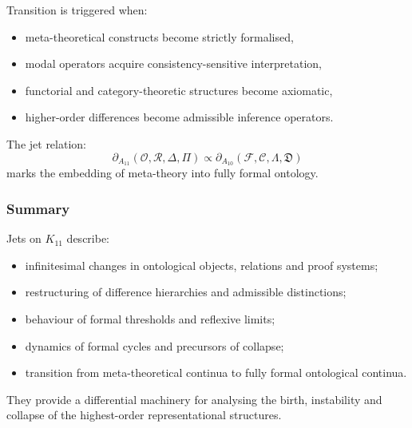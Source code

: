 Transition is triggered when:
\begin{itemize}
    \item meta-theoretical constructs become strictly formalised,
    \item modal operators acquire consistency-sensitive interpretation,
    \item functorial and category-theoretic structures become axiomatic,
    \item higher-order differences become admissible inference operators.
\end{itemize}

The jet relation:
\[
\partial_{A_{11}}(\mathcal{O},\mathcal{R},\Delta,\Pi)
\propto
\partial_{A_{10}}(\mathcal{F},\mathcal{C},\Lambda,\mathfrak{D})
\]
marks the embedding of meta-theory into fully formal ontology.


\subsubsection{Summary}

Jets on $K_{11}$ describe:
\begin{itemize}
    \item infinitesimal changes in ontological objects, relations and
          proof systems;
    \item restructuring of difference hierarchies and admissible distinctions;
    \item behaviour of formal thresholds and reflexive limits;
    \item dynamics of formal cycles and precursors of collapse;
    \item transition from meta-theoretical continua to
          fully formal ontological continua.
\end{itemize}

They provide a differential machinery for analysing the birth,
instability and collapse of the highest-order representational structures.
